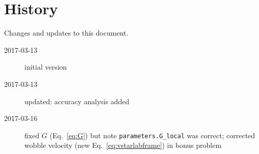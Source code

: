\documentclass[letterpaper]{scrartcl}
\begin{document}
\section{History}
\label{sec:history}

Changes and updates to this document.
\begin{description}
\item[2017-03-13] initial version
\item[2017-03-13] updated: accuracy analysis added
\item[2017-03-16] fixed $G$ (Eq.~\ref{eq:G}) but note
  \texttt{parameters.G\_local} was correct; corrected wobble velocity
  (new Eq.~\ref{eq:vstarlabframe}) in bonus problem
\end{description}

\end{document}
